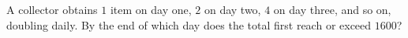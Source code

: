 A collector obtains $1$ item on day one, $2$ on day two, $4$ on day three, and so on, doubling daily. By the end of which day does the total first reach or exceed $1600$?
